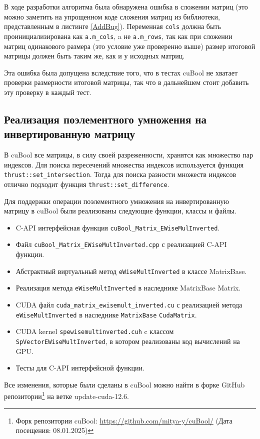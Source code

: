 В ходе разработки алгоритма была обнаружена ошибка в сложении матриц (это можно заметить на упрощенном коде сложения матриц из библиотеки, представленным в листинге \ref{AddBug}). Переменная \verb|cols| должна быть проинициализирована как \verb|a.m_cols|, a не \verb|a.m_rows|, так как при сложении матриц одинакового размера (это условие уже проверенно выше) размер итоговой матрицы должен быть таким же, как и у исходных матриц.

Эта ошибка была допущена вследствие того, что в тестах cuBool не хватает проверки размерности итоговой матрицы, так что в дальнейшем стоит добавить эту проверку в каждый тест.

\subsection{Реализация поэлементного умножения на инвертированную матрицу}

В cuBool все матрицы, в силу своей разреженности, хранятся как множество пар индексов. Для поиска пересечений множества индексов используется функция \verb|thrust::set_intersection|. Тогда для поиска разности множеств индексов отлично подходит функция \verb|thrust::set_difference|. 

Для поддержки операции поэлементного умножения на инвертированную матрицу в cuBool были реализованы следующие функции, классы и файлы.
\begin{itemize}
    \item C-API интерфейсная функция \verb|cuBool_Matrix_EWiseMulInverted|.
    \item Файл \verb|cuBool_Matrix_EWiseMultInverted.cpp| с реализацией C-API функции.
    \item Абстрактный виртуальный метод \verb|eWiseMultInverted| в классе MatrixBase.
    \item Реализация метода \verb|eWiseMultInverted| в наследнике MatrixBase Matrix.
    \item CUDA файл \verb|cuda_matrix_ewisemult_inverted.cu|
 с реализацией метода \verb|eWiseMultInverted| в наследнике \verb|MatrixBase| \verb|CudaMatrix|.
    \item CUDA kernel \verb|spewisemultinverted.cuh| c классом \verb|SpVectorEWiseMultInverted|, в котором реализованы код вычислений на GPU.
    \item Тесты для C-API интерфейсной функции.
\end{itemize}

Все изменения, которые были сделаны в cuBool можно найти в форке GitHub репозитории\footnote{Форк репозитории cuBool: \url{https://github.com/mitya-y/cuBool/} (Дата посещения: 08.01.2025)} на ветке update-cuda-12.6.

